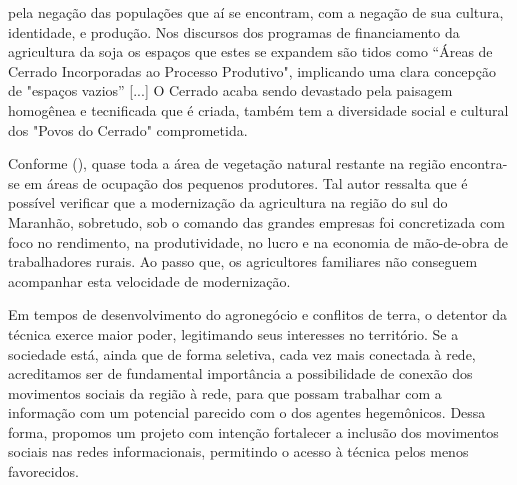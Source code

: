 \begin{citacao}
pela negação das populações que aí se encontram, com a negação de sua cultura, identidade, e produção. Nos discursos dos programas de financiamento da agricultura da soja os espaços que estes se expandem são tidos como “Áreas de Cerrado Incorporadas ao Processo Produtivo", implicando uma clara concepção de "espaços vazios” [...] O Cerrado acaba sendo devastado pela paisagem homogênea e tecnificada que é criada,  também tem a diversidade social e cultural dos "Povos do Cerrado" comprometida. \cite[p. 13]{rodrigues_alencar}
\end{citacao}

Conforme  (\citeyear{studte2008}), quase toda a área de vegetação natural restante na região encontra-se em áreas de ocupação dos pequenos produtores.  Tal autor ressalta  que é possível verificar que a modernização  da  agricultura na  região do sul do Maranhão, sobretudo, sob o comando  das grandes empresas foi concretizada  com foco no rendimento,  na produtividade, no lucro e na economia de mão-de-obra de trabalhadores rurais.  Ao passo que, os agricultores familiares não conseguem acompanhar esta velocidade de modernização.



Em tempos de desenvolvimento do agronegócio e conflitos de terra, o detentor da técnica exerce maior poder, legitimando seus interesses no território. Se a sociedade está, ainda que de forma seletiva, cada vez mais conectada à rede, acreditamos ser de fundamental importância a possibilidade de conexão dos movimentos sociais da região à rede, para que possam trabalhar com a informação com um potencial parecido com o dos agentes hegemônicos. Dessa forma, propomos um projeto com intenção fortalecer a inclusão dos movimentos sociais nas redes informacionais, permitindo o acesso à técnica pelos menos favorecidos.

